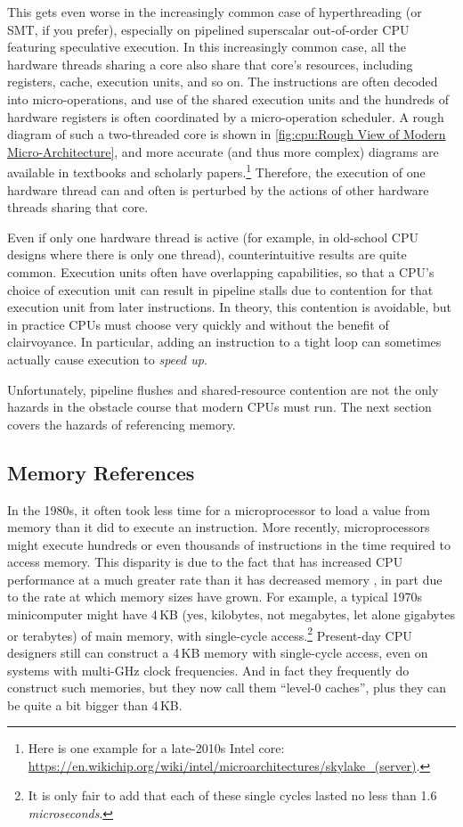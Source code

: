 This gets even worse in the increasingly common case of hyperthreading
(or SMT, if you prefer), especially on pipelined superscalar out-of-order
CPU featuring speculative execution.
In this increasingly common case, all the hardware threads sharing
a core also share that core's resources, including registers, cache,
execution units, and so on.
The instructions are often decoded into micro-operations, and use of the
shared execution units and the hundreds of hardware registers is often
coordinated by a micro-operation scheduler.
A rough diagram of such a two-threaded core is shown in
\cref{fig:cpu:Rough View of Modern Micro-Architecture},
and more accurate (and thus more complex) diagrams are available in
textbooks and scholarly papers.\footnote{
	Here is one example for a late-2010s Intel core:
	\url{https://en.wikichip.org/wiki/intel/microarchitectures/skylake_(server)}.}
Therefore, the execution of one hardware thread can and often is perturbed
by the actions of other hardware threads sharing that core.

Even if only one hardware thread is active (for example, in old-school
CPU designs where there is only one thread), counterintuitive results
are quite common.
Execution units often have overlapping capabilities, so that a CPU's
choice of execution unit can result in pipeline stalls due to contention
for that execution unit from later instructions.
In theory, this contention is avoidable, but in practice CPUs must choose
very quickly and without the benefit of clairvoyance.
In particular, adding an instruction to a tight loop can sometimes
actually cause execution to \emph{speed up}.

Unfortunately, pipeline flushes and shared-resource contention are not
the only hazards in the obstacle course that modern CPUs must run.
The next section covers the hazards of referencing memory.

\subsection{Memory References}
\label{sec:cpu:Memory References}

In the 1980s, it often took less time for a microprocessor to load a value
from memory than it did to execute an instruction.
More recently, microprocessors might execute hundreds or even thousands
of instructions in the time required to access memory.
This disparity is due to the fact that  has increased CPU
performance at a much greater rate than it has decreased memory ,
in part due to the rate at which memory sizes have grown.
For example, a typical 1970s minicomputer might have 4\,KB (yes, kilobytes,
not megabytes, let alone gigabytes or terabytes) of main memory, with
single-cycle access.\footnote{
	It is only fair to add that each of these single cycles
	lasted no less than 1.6 \emph{microseconds}.}
Present-day CPU designers still can construct a 4\,KB memory with single-cycle
access, even on systems with multi-GHz clock frequencies.
And in fact they frequently do construct such memories, but they now
call them ``level-0 caches'', plus they can be quite a bit bigger than 4\,KB.

